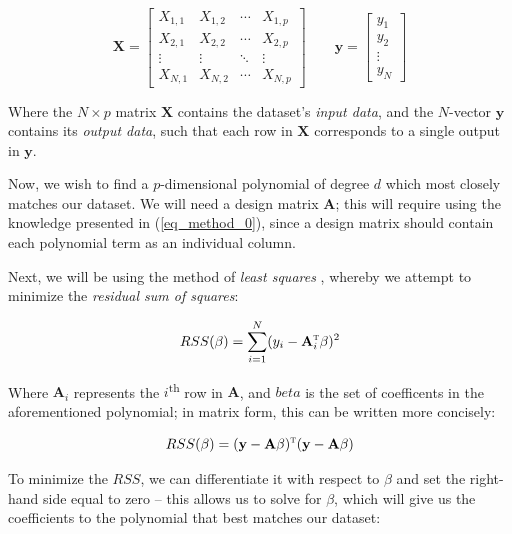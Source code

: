 \documentclass[a4paper,10pt,english]{article}
\begin{document}
\begin{equation}
\label{eq_method_1}
\mathbf{X} = \begin{bmatrix} X_{1,1} & X_{1,2} & \cdots & X_{1,p} \\ X_{2,1} & X_{2,2} & \cdots & X_{2,p} \\ \vdots & \vdots & \ddots & \vdots \\ X_{N,1} & X_{N,2} & \cdots & X_{N,p} \end{bmatrix} \qquad \mathbf{y} = \begin{bmatrix} y_1 \\ y_2 \\ \vdots \\ y_N \end{bmatrix}
\end{equation}

Where the $N \times p$ matrix $\mathbf{X}$ contains the dataset's \textit{input data}, and the $N$-vector $\mathbf{y}$ contains its \textit{output data}, such that each row in $\mathbf{X}$ corresponds to a single output in $\mathbf{y}$.

Now, we wish to find a $p$-dimensional polynomial of degree $d$ which most closely matches our dataset. We will need a design matrix $\mathbf{A}$; this will require using the knowledge presented in (\ref{eq_method_0}), since a design matrix should contain each polynomial term as an individual column.

Next, we will be using the method of \textit{least squares} \cite{hastie_tibshirani_friedman_2013}, whereby we attempt to minimize the \textit{residual sum of squares}:

\begin{equation*}
RSS(\beta) = \sum_{i=1}^N (y_i - \mathbf{A}_i^\textsc{t} \beta)^2 
\end{equation*}

Where $\mathbf{A}_i$ represents the $i$\textsuperscript{th} row in $\mathbf{A}$, and $beta$ is the set of coefficents in the aforementioned polynomial; in matrix form, this can be written more concisely:

\begin{equation*}
RSS(\beta) = (\mathbf{y} - \mathbf{A} \beta)^\textsc{t}(\mathbf{y} - \mathbf{A} \beta)
\end{equation*}

To minimize the $RSS$, we can differentiate it with respect to $\beta$ and set the right-hand side equal to zero – this allows us to solve for $\beta$, which will give us the coefficients to the polynomial that best matches our dataset:
\end{document}
